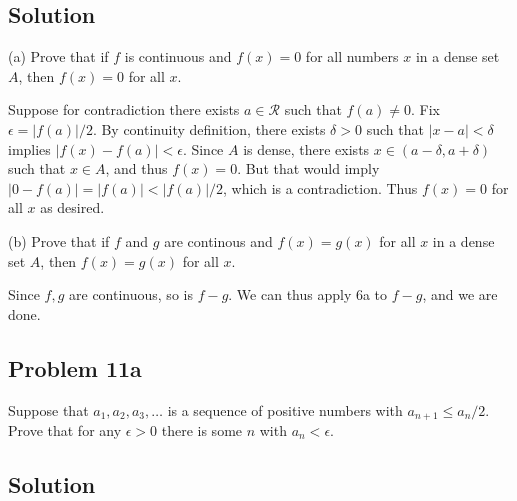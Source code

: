 \subsection*{Solution}

(a) Prove that if $f$ is continuous and $f(x)=0$ for all numbers $x$
in a dense set $A$, then $f(x)=0$ for all $x$.

\vs

Suppose for contradiction there exists $a\in\mathcal{R}$ such that
$f(a)\neq0$. Fix $\epsilon=|f(a)|/2$. By continuity definition, there exists
$\delta>0$ such that $|x-a|<\delta$ implies $|f(x)-f(a)|<\epsilon$. Since
$A$ is dense, there exists $x\in(a-\delta, a+\delta)$ such that
$x\in A$, and thus $f(x)=0$. But that would imply
$|0-f(a)|=|f(a)|<|f(a)|/2$, which is a contradiction. Thus $f(x)=0$
for all $x$ as desired.

\vs

(b) Prove that if $f$ and $g$ are continous and $f(x)=g(x)$ for all
$x$ in a dense set $A$, then $f(x)=g(x)$ for all $x$.

\vs

Since $f,g$ are continuous, so is $f-g$. We can thus apply 6a to
$f-g$, and we are done.

\subsection*{Problem 11a}
Suppose that $a_{1}, a_{2}, a_{3}, \ldots$ is a sequence of positive
numbers with $a_{n+1}\leq a_{n}/2$. Prove that for any $\epsilon>0$ there is
some $n$ with $a_{n}<\epsilon$.

\subsection*{Solution}


